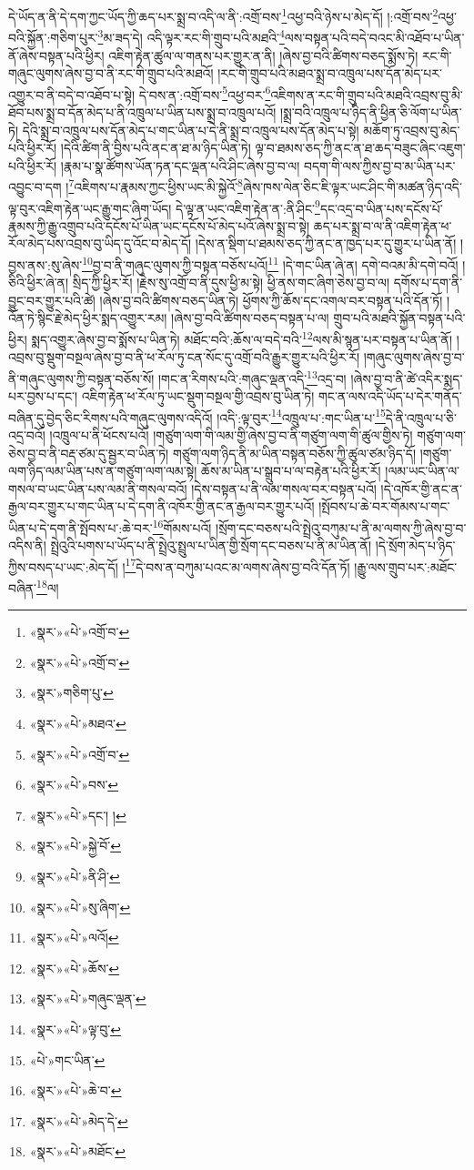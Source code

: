 དེ་ཡོད་ན་ནི་དེ་དག་ཀྱང་ཡོད་ཀྱི་ཆད་པར་སྨྲ་བ་འདི་ལ་ནི་:འགྲོ་བས་\footnote{«སྣར་»«པེ་»འགྲོ་བ་}འཕྱ་བའི་ཉེས་པ་མེད་དོ། །:འགྲོ་བས་\footnote{«སྣར་»«པེ་»འགྲོ་བ་}འཕྱ་བའི་སྐྱོན་:གཅིག་པུར་\footnote{«སྣར་»གཅིག་པུ་}མ་ཟད་དེ། འདི་ལྟར་རང་གི་གྲུབ་པའི་མཐའི་\footnote{«སྣར་»«པེ་»མཐའ་}ལས་བསྟན་པའི་བདེ་བའང་མི་འཐོབ་པ་ཡིན་ནོ་ཞེས་བསྟན་པའི་ཕྱིར། འཇིག་རྟེན་ཚུལ་ལ་གནས་པར་གྱུར་ན་ནི། །ཞེས་བྱ་བའི་ཚིགས་བཅད་སྨོས་ཏེ། རང་གི་གཞུང་ལུགས་ཞེས་བྱ་བ་ནི་རང་གི་གྲུབ་པའི་མཐའོ། །རང་གི་གྲུབ་པའི་མཐའ་སྨྲ་བ་འཁྲུལ་པས་དོན་མེད་པར་འགྱུར་བ་ནི་བདེ་བ་འཐོབ་པ་སྟེ། དེ་བས་ན་:འགྲོ་བས་\footnote{«སྣར་»«པེ་»འགྲོ་བ་}འཕྱ་བར་\footnote{«སྣར་»«པེ་»བས་}འཇིགས་ན་རང་གི་གྲུབ་པའི་མཐའི་འབྲས་བུ་མི་ཐོབ་པས་སྨྲ་བ་དོན་མེད་པ་ནི་འཁྲུལ་པ་ཡིན་པས་སྨྲ་བ་འཁྲུལ་པའོ། །སྨྲ་བའི་འཁྲུལ་པ་ཉིད་ནི་ཕྱིན་ཅི་ལོག་པ་ཡིན་ཏེ། དེའི་སྨྲ་བ་འཁྲུལ་པས་དོན་མེད་པ་གང་ཡིན་པ་དེ་ནི་སྨྲ་བ་འཁྲུལ་པས་དོན་མེད་པ་སྟེ། མཆོག་ཏུ་འབྲས་བུ་མེད་པའི་ཕྱིར་རོ། །དེའི་ཚིག་ནི་བྱིས་པའི་ནང་ན་ཐ་མ་ཉིད་ཡིན་ཏེ། ལྟ་བ་ཐམས་ཅད་ཀྱི་ནང་ན་ཐ་ཆད་བཟུང་ཞིང་འཇུག་པའི་ཕྱིར་རོ། །རྣམ་པ་སྣ་ཚོགས་ཡོན་ཏན་དང་ལྡན་པའི་ཤིང་ཞེས་བྱ་བ་ལ། བདག་གི་ལས་ཀྱིས་བྱ་བ་མ་ཡིན་པར་འབྱུང་བ་དག །\footnote{«སྣར་»«པེ་»དང་། །}འཇིགས་པ་རྣམས་ཀྱང་ཕྱིས་ཡང་མི་སྐྱེའོ་\footnote{«སྣར་»«པེ་»སྐྱེ་བོ་}ཞེས་ཁས་ལེན་ཅིང་ཇི་ལྟར་ཡང་ཤིང་གི་མཚན་ཉིད་འདི་ལྟ་བུར་འཇིག་རྟེན་ཡང་རྒྱུ་གང་ཞིག་ཡོད། དེ་ལྟ་ན་ཡང་འཇིག་རྟེན་ན་:ནི་ཤིང་\footnote{«སྣར་»«པེ་»ནི་ཤི་}དང་འདྲ་བ་ཡིན་པས་དངོས་པོ་རྣམས་ཀྱི་རྒྱུ་འགྲུབ་པའི་དངོས་པོ་ཡིན་ཡང་དངོས་པོ་མེད་པའོ་ཞེས་སྨྲ་བ་སྟེ། ཆད་པར་སྨྲ་བ་ལ་ནི་འཇིག་རྟེན་ཕ་རོལ་མེད་པས་འབྲས་བུ་ཡིད་དུ་འོང་བ་མེད་དོ། །དེས་ན་སྡིག་པ་ཐམས་ཅད་ཀྱི་ནང་ན་ཁྱད་པར་དུ་གྱུར་པ་ཡིན་ནོ། །བྱས་ནས་:སུ་ཞེས་\footnote{«སྣར་»«པེ་»སུ་ཞིག་}བྱ་བ་ནི་གཞུང་ལུགས་ཀྱི་བསྟན་བཅོས་པའོ།\footnote{«སྣར་»«པེ་»ལའོ།} །དེ་གང་ཡིན་ཞེ་ན། དགེ་བའམ་མི་དགེ་བའོ། །ཅིའི་ཕྱིར་ཞེ་ན། སྲིད་ཀྱི་ཕྱིར་རོ། །རྗེས་སུ་འགྲོ་བ་ནི་དུས་ཕྱི་མ་སྟེ། ཕྱི་ནས་གང་ཞིག་ཅེས་བྱ་བ་ལ། དགོས་པ་དག་ནི་བྱུང་བར་གྱུར་པའི་ཚེ། །ཞེས་བྱ་བའི་ཚིགས་བཅད་ཡིན་ཏེ། ཕྱོགས་ཀྱི་ཆོས་དང་འགལ་བར་བསྟན་པའི་དོན་ཏོ། །འོན་ཏེ་སྙིང་རྗེ་མེད་ཕྱིར་སྨད་འགྱུར་རམ། །ཞེས་བྱ་བའི་ཚིགས་བཅད་བསྟན་པ་ལ། གྲུབ་པའི་མཐའི་སྐྱོན་བསྟན་པའི་ཕྱིར། སྨད་འགྱུར་ཞེས་བྱ་བ་སྨོས་པ་ཡིན་ཏེ། མཐོང་བའི་:ཆོས་ལ་བདེ་བའི་\footnote{«སྣར་»«པེ་»ཆོས་}ལས་མི་སྙན་པར་བསྟན་པ་ཡིན་ནོ། །འབྲས་བུ་སྡུག་བསྔལ་ཞེས་བྱ་བ་ནི་ཕ་རོལ་ཏུ་ངན་སོང་དུ་འགྲོ་བའི་རྒྱུར་གྱུར་པའི་ཕྱིར་རོ། །གཞུང་ལུགས་ཞེས་བྱ་བ་ནི་གཞུང་ལུགས་ཀྱི་བསྟན་བཅོས་སོ། །གང་ན་རིགས་པའི་:གཞུང་ལྡན་འདི་\footnote{«སྣར་»«པེ་»གཞུང་ལྡན་}འདྲ་བ། །ཞེས་བྱ་བ་ནི་ཚེ་འདིར་སྨད་པར་བྱས་པ་དང་། འཇིག་རྟེན་ཕ་རོལ་ཏུ་ཡང་སྡུག་བསྔལ་གྱི་འབྲས་བུ་ཡིན་ཏེ། གང་ན་ལས་འདི་ཡོད་པ་དེར་གནོད་བཞིན་དུ་བྱེད་ཅིང་རིགས་པའི་གཞུང་ལུགས་འདིའོ། །འདི་:ལྟ་བུར་\footnote{«སྣར་»«པེ་»ལྟ་བུ་}འཁྲུལ་པ་:གང་ཡིན་པ་\footnote{«པེ་»གང་ཡིན་}དེ་ནི་འཁྲུལ་པ་ཅི་འདྲ་བའོ། །འཁྲུལ་པ་ནི་ཕོངས་པའོ། །གཙུག་ལག་གི་ལམ་གྱི་ཞེས་བྱ་བ་ནི་གཙུག་ལག་གི་ཚུལ་གྱིས་ཏེ། གཙུག་ལག་ཅེས་བྱ་བ་ནི་བརྡ་ཙམ་དུ་སྦྱར་བ་ཡིན་ཏེ། གཙུག་ལག་ཉིད་ནི་མ་ཡིན་བསྟན་བཅོས་ཀྱི་ཚུལ་ཙམ་ཉིད་དོ། །གཙུག་ལག་ཉིད་ལམ་ཡིན་པས་ན་གཙུག་ལག་ལམ་སྟེ། ཆོས་མ་ཡིན་པ་སྒྲུབ་པ་ལ་བརྟེན་པའི་ཕྱིར་རོ། །ལམ་ཡང་ཡིན་ལ་གསལ་བ་ཡང་ཡིན་པས་ལམ་ནི་གསལ་བའོ། །དེས་བསྟན་པ་ནི་ལམ་གསལ་བར་བསྟན་པའོ། །དེ་འཁོར་གྱི་ནང་ན་རྒྱལ་བར་གྱུར་པ་གང་ཡིན་པ་དེ་དག་ནི་འཁོར་གྱི་ནང་ན་རྒྱལ་བར་གྱུར་པའོ། །སྤོབས་པ་ཆེ་བར་གོམས་པ་གང་ཡིན་པ་དེ་དག་ནི་སྤོབས་པ་:ཆེ་བར་\footnote{«སྣར་»«པེ་»ཆེ་བ་}གོམས་པའོ། །སྲོག་དང་བཅས་པའི་སྤྲེའུ་བཀུམ་པ་ནི་མ་ལགས་ཀྱི་ཞེས་བྱ་བ་འདིས་ནི། སྤྲེའུའི་པགས་པ་ཡོད་པ་ནི་སྤྲེའུ་སྤྲུལ་པ་ཡིན་གྱི་སྲོག་དང་བཅས་པ་ནི་མ་ཡིན་ནོ། །དེ་སྲོག་མེད་པ་ཉིད་ཀྱིས་བསད་པ་ཡང་:མེད་དོ། །\footnote{«སྣར་»«པེ་»མེད་དེ་}དེ་བས་ན་བཀུམ་པའང་མ་ལགས་ཞེས་བྱ་བའི་དོན་ཏོ། །རྒྱུ་ལས་གྲུབ་པར་:མཐོང་བཞིན་\footnote{«སྣར་»«པེ་»མཐོང་}ལ། 